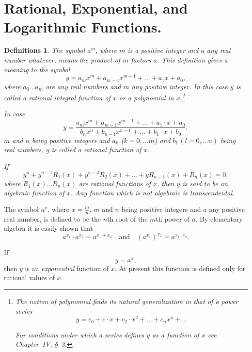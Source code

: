 \documentclass[a4paper,12pt]{book}[2004/02/16]
\providecommand{\hyperlink}[2]{#2}
\providecommand{\hypertarget}[2]{#2}
\theoremstyle{ilemma}
\theoremstyle{itheorem}
\theoremstyle{iother}
\theoremstyle{icorollary}
\theoremstyle{numcorollary}
\theoremstyle{idefinition}
\newtheorem*{definitions}{Definitions}
\renewcommand{\dfrac}[2]{\frac{#1}{#2}}%
\begin{document}
\section[Rational, Exponential, and Logarithmic Functions.]{Rational, Exponential, and Logarithmic Functions.}\hypertarget{chIIIsec4}{}%
\label{s4p53}

\begin{definitions}
The symbol $a^m$, where $m$ is a positive integer and $a$ any real
number whatever, means the product of $m$ factors $a$. This definition
gives a meaning to the symbol
\[
  y=a_mx^m + a_{m-1}x^{m-1} + \ldots + a_1x + a_0,
\]
where $a_0 \ldots a_m$ are any real numbers and $m$ any positive
integer.  In this case $y$ is called a rational integral function of
$x$ or a polynomial in $x$.\footnote{%
  The notion of polynomial finds its natural generalization in that of
  a power series
\[
  y=c_0+c\cdot x+c_2\cdot x^2+ \ldots + c_nx^n+ \ldots
\]

  For conditions under which a series defines $y$ as a function of $x$
  see Chapter~\hyperlink{chapIV}{IV}, \hyperlink{chIVsec3}{\S~3}.}

In case
\[
  y = \frac{a_mx^m + a_{m-1}x^{m-1} + \ldots + a_1\cdot x + a_0}
           {b_nx^n + b_{n-1}x^{n-1} + \ldots + b_1\cdot x + b_0},
\]
$m$ and $n$ being positive integers and $a_k$ ($k=0,\ldots m$) and
$b_l\ (l=0,\ldots n)$ being real numbers, $y$ is called a rational
function of $x$.

If
\[
  y^n + y^{n-1}R_1(x) + y^{n-2}R_2(x) + \ldots
  + yR_{n-1}(x) + R_n(x) = 0,
\]
where $R_1(x) \ldots R_n(x)$ are rational functions of $x$, then $y$
is said to
be an algebraic function of $x$. Any function which is not algebraic
is transcendental.
\end{definitions}
The symbol $a^x$, where $x=\dfrac{m}{n}$, $m$ and $n$ being positive
integers and $a$ any positive real number, is defined to be the $n$th
root of the $m$th power of $a$. By elementary algebra it is easily
shown that
\[
  a^{x_1} \cdot a^{x_2} = a^{x_1+x_2} \quad\text{and}\quad
  (a^{x_1})^{x_2} = a^{x_1 \cdot x_2}.
\]

If
\[
  y=a^x,
\]
then $y$ is an \textit{exponential} function of $x$. At present this
function is defined only for rational values of $x$.
\end{document}
